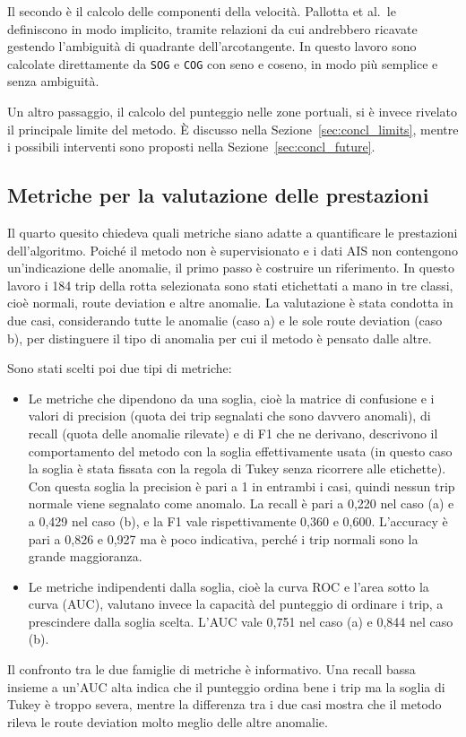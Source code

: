 Il secondo è il calcolo delle componenti della velocità. Pallotta et al.~le definiscono in modo
implicito, tramite relazioni da cui andrebbero ricavate gestendo l'ambiguità di quadrante
dell'arcotangente. In questo lavoro sono calcolate direttamente da \texttt{SOG} e \texttt{COG}
con seno e coseno, in modo più semplice e senza ambiguità.

Un altro passaggio, il calcolo del punteggio nelle zone portuali, si è invece rivelato il
principale limite del metodo. È discusso nella Sezione~\ref{sec:concl_limits}, mentre i
possibili interventi sono proposti nella Sezione~\ref{sec:concl_future}.

\subsection[Metriche per la valutazione delle prestazioni]{Metriche per la valutazione delle prestazioni}

Il quarto quesito chiedeva quali metriche siano adatte a quantificare le prestazioni
dell'algoritmo. Poiché il metodo non è supervisionato e i dati AIS non contengono un'indicazione
delle anomalie, il primo passo è costruire un riferimento. In questo lavoro i 184 trip della rotta
selezionata sono stati etichettati a mano in tre classi, cioè normali, route deviation e altre
anomalie. La valutazione è stata condotta in due casi, considerando tutte le anomalie (caso a) e le
sole route deviation (caso b), per distinguere il tipo di anomalia per cui il metodo è pensato
dalle altre.

Sono stati scelti poi due tipi di metriche:
\begin{itemize}
    \item Le metriche che dipendono da una soglia, cioè la matrice di confusione e i valori 
    di precision (quota dei trip segnalati che sono davvero anomali), di recall (quota delle
    anomalie rilevate) e di F1 che ne derivano, descrivono il comportamento
    del metodo con la soglia effettivamente usata (in questo caso la soglia è stata fissata 
    con la regola di Tukey senza ricorrere alle etichette). 
    Con questa soglia la precision è pari a 1 in entrambi i casi, quindi nessun trip normale viene segnalato come anomalo.
    La recall è pari a 0,220 nel caso (a) e a 0,429 nel caso (b), e la F1 vale rispettivamente 0,360 e 0,600. L'accuracy è pari a 0,826 e 0,927 ma è poco indicativa, perché i trip normali sono la grande maggioranza.
    \item Le metriche indipendenti dalla soglia, cioè la curva ROC e l'area sotto la curva (AUC), valutano invece la capacità del punteggio di ordinare i trip, a prescindere dalla soglia scelta. L'AUC vale 0,751 nel caso (a) e 0,844 nel caso (b).
\end{itemize}
Il confronto tra le due famiglie di metriche è informativo. Una recall bassa insieme a un'AUC alta indica che il punteggio ordina bene i trip ma la soglia di Tukey è troppo severa, mentre la differenza tra i due casi mostra che il metodo rileva le route deviation molto meglio delle altre anomalie.

